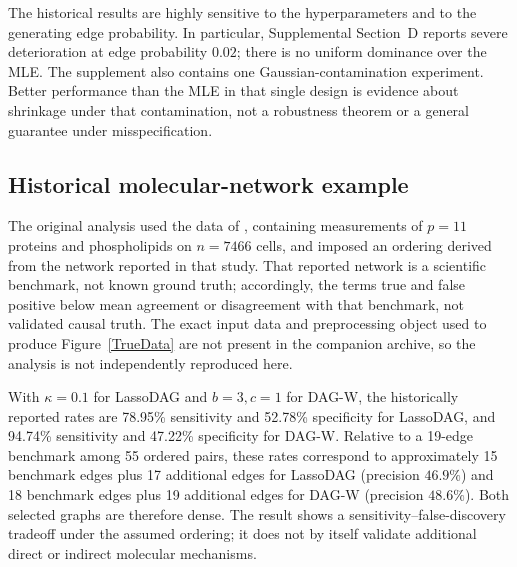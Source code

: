 \documentclass[12pt]{article}
\theoremstyle{plain}
\theoremstyle{definition}
\theoremstyle{remark}
\begin{document}
The historical results are highly sensitive to the hyperparameters and
to the generating edge probability.  In particular, Supplemental
Section~D reports severe deterioration at edge probability \(0.02\);
there is no uniform dominance over the MLE.  The supplement also
contains one Gaussian-contamination experiment.  Better performance
than the MLE in that single design is evidence about shrinkage under
that contamination, not a robustness theorem or a general guarantee
under misspecification.

\subsection{Historical molecular-network example}
The original analysis used the data of \cite{Sachs2003}, containing
measurements of \(p=11\) proteins and phospholipids on \(n=7466\)
cells, and imposed an ordering derived from the network reported in that
study.  That reported network is a scientific benchmark, not known
ground truth; accordingly, the terms true and false positive below mean
agreement or disagreement with that benchmark, not validated causal
truth.  The exact input data and preprocessing object used to produce
Figure~\ref{TrueData} are not present in the companion archive, so the
analysis is not independently reproduced here.

With \(\kappa=0.1\) for LassoDAG and \(b=3,c=1\) for DAG-W, the
historically reported rates are 78.95\% sensitivity and 52.78\%
specificity for LassoDAG, and 94.74\% sensitivity and 47.22\%
specificity for DAG-W.  Relative to a 19-edge benchmark among 55
ordered pairs, these rates correspond to approximately 15 benchmark
edges plus 17 additional edges for LassoDAG (precision \(46.9\%\)) and
18 benchmark edges plus 19 additional edges for DAG-W (precision
\(48.6\%\)).  Both selected graphs are therefore dense.  The result
shows a sensitivity--false-discovery tradeoff under the assumed
ordering; it does not by itself validate additional direct or indirect
molecular mechanisms.
\end{document}
